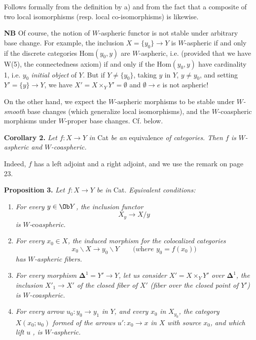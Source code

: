 Follows formally from the definition by a) and from the fact that a composite of two local isomorphisms (resp. local co-isomorphisms) is likewise.

\textbf{NB} Of course, the notion of $W$-aspheric functor is not stable under arbitrary base change. For example, the inclusion $X = \{y_0\} \longrightarrow Y$ is $W$-aspheric if and only if the discrete categories $\mathrm{Hom}(y_0, y)$ are $W$-aspheric, i.e. (provided that we have W(5), the connectedness axiom) if and only if the $\mathrm{Hom}(y_0, y)$ have cardinality 1, i.e. $y_0$ \textit{initial object} of $Y$. But if $Y \neq \{y_0\}$, taking $y$ in $Y$, $y \neq y_0$, and setting $Y' = \{y\} \longrightarrow Y$, we have $X' = X \times_Y Y' = \emptyset$ and $\emptyset \longrightarrow e$ is not aspheric!

On the other hand, we expect the $W$-aspheric morphisms to be stable under \textit{$W$-smooth} base changes (which generalize local isomorphisms), and the $W$-coaspheric morphisms under $W$-proper base changes. Cf. below.

\textbf{Corollary 2.} \textit{Let $f : X \longrightarrow Y$ in} \textup{Cat} \textit{be an} \textup{equivalence} \textit{of categories. Then $f$ is $W$-aspheric and $W$-coaspheric.}

Indeed, $f$ has a left adjoint and a right adjoint, and we use the remark on page 23.

\textbf{Proposition 3.} \textit{Let $f : X \longrightarrow Y$ be in} \textup{Cat}. \textit{Equivalent conditions:}


\begin{enumerate}
\item[\textit{a)}] \textit{For every $y \in \Ob Y$, the inclusion functor}
\[
X_y \longrightarrow X/y \tag*{$(*)$}
\]
\textit{is $W$-}co\textit{aspheric.}
\item[\textit{b)}] \textit{For every $x_0 \in X$, the induced morphism for the colocalized categories}
\[
x_0\backslash X \longrightarrow y_0\backslash Y \qquad \textit{(where $y_0 = f(x_0)$)}
\]
\textit{has $W$-aspheric fibers.}
\item[\textit{c)}] \textit{For every morphism $\mathbf{\Delta}^1 = Y' \longrightarrow Y$, let us consider $X' = X \times_Y Y'$ over $\mathbf{\Delta}^1$, the inclusion $X'_1 \longrightarrow X'$ of the closed fiber of $X'$ (fiber over the closed point of $Y'$) is $W$-coaspheric.}
\item[\textit{d)}] \textit{For every arrow $u_0 : y_0 \longrightarrow y_1$ in $Y$, and every $x_0$ in $X_{y_0}$, the category $X(x_0;u_0)$ formed of the arrows $u' : x_0 \longrightarrow x$ in $X$ with source $x_0$, and which lift $u$} \textit{, is $W$-aspheric.}
\end{enumerate}

